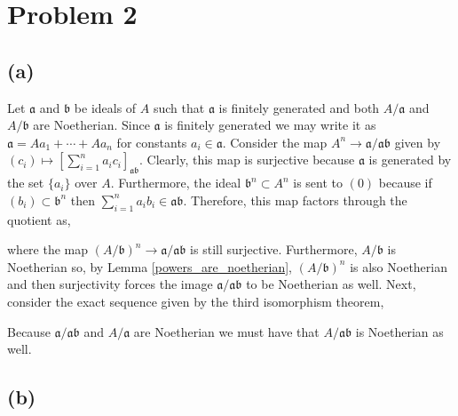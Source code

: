 \documentclass[12pt]{extarticle}
\begin{document}
\section{Problem 2}

\renewcommand{\a}{\mathfrak{a}}
\renewcommand{\b}{\mathfrak{b}}

\subsection*{(a)}
Let $\a$ and $\b$ be ideals of $A$ such that $\a$ is finitely generated and both $A / \a$ and $A / \b$ are Noetherian. Since $\a$ is finitely generated we may write it as $\a = A a_1 + \cdots + A a_n$ for constants $a_i \in \a$. Consider the map $A^n \to \a / \a \b$ given by $(c_i) \mapsto \left[ \sum_{i = 1}^n a_i c_i \right]_{\a \b}$. Clearly, this map is surjective because $\a$ is generated by the set $\{ a_i \}$ over $A$. Furthermore, the ideal $\b^n \subset A^n$ is sent to $(0)$ because if $(b_i) \subset \b^n$ then $\sum_{i = 1}^n a_i b_i \in \a \b$. Therefore, this map factors through the quotient as,
\begin{center}
\end{center}
where the map $(A / \b)^n \to \a / \a \b$ is still surjective. Furthermore, $A / \b$ is Noetherian so, by Lemma \ref{powers_are_noetherian}, $(A / \b)^n$ is also Noetherian and then surjectivity forces the image $\a / \a \b$ to be Noetherian as well. Next, consider the exact sequence given by the third isomorphism theorem,
\begin{center}
\end{center}
Because $\a / \a \b$ and $A / \a$ are Noetherian we must have that $A / \a \b$ is Noetherian as well. 


\subsection*{(b)}
\end{document}
